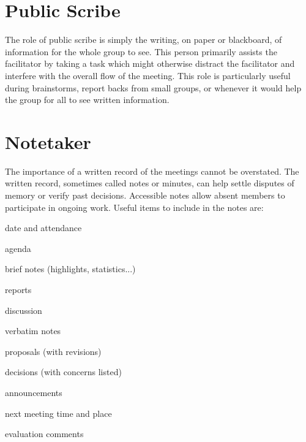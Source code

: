 \section{Public Scribe}
\label{role:public_scribe}
The role of public scribe is simply the writing, on paper or blackboard, of information for the whole group to see. This person primarily assists the facilitator by taking a task which might otherwise distract the facilitator and interfere with the overall flow of the meeting. This role is particularly useful during brainstorms, report backs from small groups, or whenever it would help the group for all to see written information.

\section{Notetaker}
\label{role:notetaker}

The importance of a written record of the meetings cannot be overstated.  The written record, sometimes called notes or minutes, can help settle disputes of memory or verify past decisions. Accessible notes allow absent members to participate in ongoing work. Useful items to include in the notes are:

\squishitemize%

\item date and attendance
\item {}agenda
\item brief notes (highlights, statistics...)
\squishitemizetwo%
\item reports
\item discussion
\squishend%


\item verbatim notes

\squishitemizetwo%

\item proposals (with revisions)
\item decisions (with concerns listed)
\item announcements
\item next meeting time and place
\item {}evaluation comments
\squishend%


